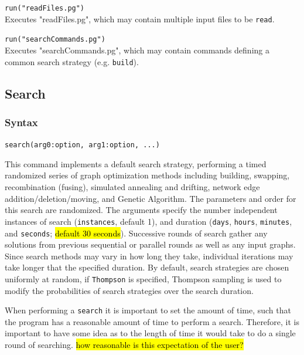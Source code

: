	\begin{example}
		\item{\texttt{run("readFiles.pg")}\\ Executes "readFiles.pg", which may contain multiple input 
		files to be \texttt{read}.}
		
		\item{\texttt{run("searchCommands.pg")}\\ Executes "searchCommands.pg", which may 
		contain commands defining a common search strategy (e.g. \texttt{build}).}
	\end{example}

\subsection{Search}
	\subsubsection{Syntax}
		\texttt{search(arg0:option, arg1:option, ...)}
	
	\begin{phygdescription}
		{This command implements a default search strategy, performing a timed randomized 
		series of graph optimization methods including building, swapping, recombination (fusing), 
		simulated annealing and drifting, network edge addition/deletion/moving, and Genetic 
		Algorithm. The parameters and order for this search are randomized. The arguments 
		specify the number independent instances of search (\texttt{instances}, default 1), and duration 
		(\texttt{days}, \texttt{hours}, \texttt{minutes}, and \texttt{seconds}; 
		\hl{default 30 seconds}). Successive rounds of search gather 
		any solutions from previous sequential or parallel rounds as well as any input graphs.
		Since search methods may vary in how long they take, individual iterations may take 
		longer that the specified duration.  By default, search strategies are chosen uniformly at random, 
		if \texttt{Thompson} is specified, Thompson sampling \cite{Thompson1933,WheelerThompson} 
		is used to modify the probabilities of search strategies over the search duration.
		
		When performing a \texttt{search} it is important to set the amount of time, such that the 
		program has a reasonable amount of time to perform a search. Therefore, it is important
		to have some idea as to the length of time it would take to do a single round of searching.
		\hl{how reasonable is this expectation of the user?}}
	\end{phygdescription}
			
